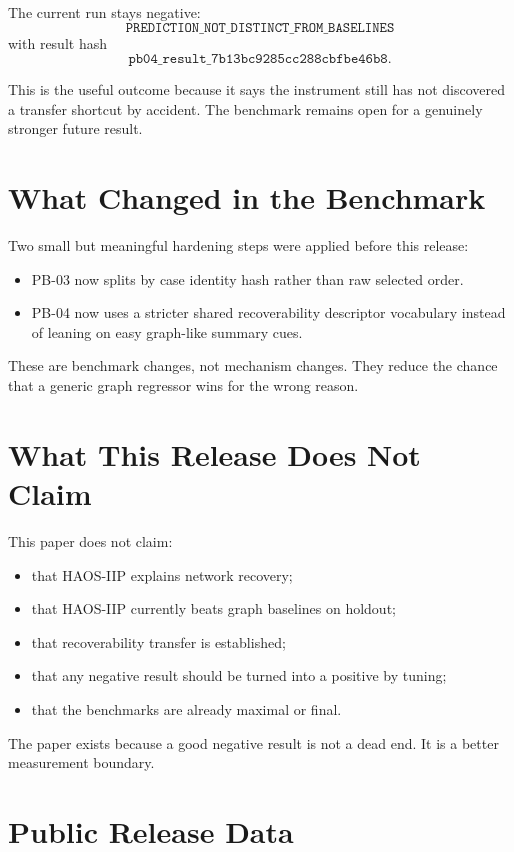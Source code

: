 \documentclass[11pt]{article}
\begin{document}
The current run stays negative:
\[
\texttt{PREDICTION\_NOT\_DISTINCT\_FROM\_BASELINES}
\]
with result hash
\[
\texttt{pb04\_result\_7b13bc9285cc288cbfbe46b8}.
\]

This is the useful outcome because it says the instrument still has not discovered a transfer shortcut by accident. The benchmark remains open for a genuinely stronger future result.

\section{What Changed in the Benchmark}

Two small but meaningful hardening steps were applied before this release:
\begin{itemize}
\item PB-03 now splits by case identity hash rather than raw selected order.
\item PB-04 now uses a stricter shared recoverability descriptor vocabulary instead of leaning on easy graph-like summary cues.
\end{itemize}

These are benchmark changes, not mechanism changes. They reduce the chance that a generic graph regressor wins for the wrong reason.

\section{What This Release Does Not Claim}

This paper does not claim:
\begin{itemize}
\item that HAOS-IIP explains network recovery;
\item that HAOS-IIP currently beats graph baselines on holdout;
\item that recoverability transfer is established;
\item that any negative result should be turned into a positive by tuning;
\item that the benchmarks are already maximal or final.
\end{itemize}

The paper exists because a good negative result is not a dead end. It is a better measurement boundary.

\section{Public Release Data}
\end{document}
